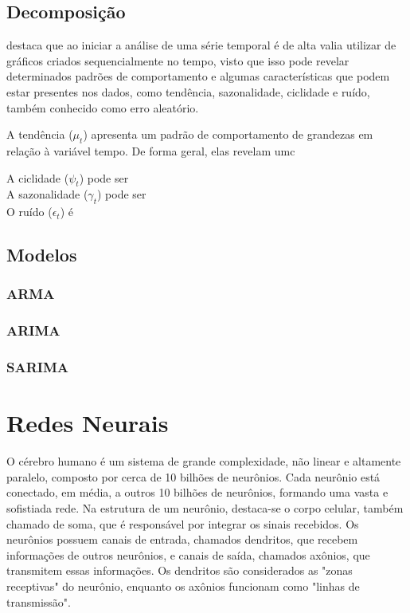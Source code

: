     \subsection{Decomposição}

         destaca que ao iniciar a análise de uma série temporal é de alta valia utilizar de gráficos 
        criados sequencialmente no tempo, visto que isso pode revelar determinados padrões de comportamento e algumas 
        características que podem estar presentes nos dados, como tendência, sazonalidade, ciclidade e ruído, também 
        conhecido como erro aleatório. 

        A tendência ($\mu_t$) apresenta um padrão de comportamento de grandezas em relação à variável tempo. De forma
        geral, elas revelam umc
        
        A ciclidade ($\psi_t$) pode ser \\
        
        A sazonalidade ($\gamma_t$) pode ser \\
        
        O ruído ($\epsilon_t$) é 


    \subsection{Modelos}
        \subsubsection{ARMA}
        \subsubsection{ARIMA}
        \subsubsection{SARIMA}

\section{Redes Neurais}
    O cérebro humano é um sistema de grande complexidade, não linear e altamente paralelo, composto por cerca de 
    10 bilhões de neurônios. Cada neurônio está conectado, em média, a outros 10 bilhões de neurônios, formando uma 
    vasta e sofistiada rede. Na estrutura de um neurônio, destaca-se o corpo celular, também chamado de soma, que é 
    responsável por integrar os sinais recebidos. Os neurônios possuem canais de entrada, chamados dendritos, que 
    recebem informações de outros neurônios, e canais de saída, chamados axônios, que transmitem essas informações. 
    Os dendritos são considerados as "zonas receptivas" do neurônio, enquanto os axônios funcionam como 
    "linhas de transmissão".

